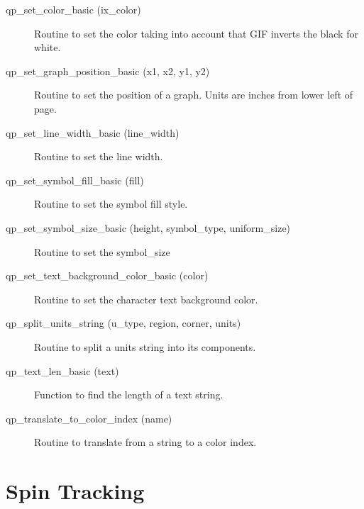 \begin{description}
\label{r:qp.set.color.basic}
\item[qp_set_color_basic (ix_color)  ] \Newline 
Routine to set the color taking into account that GIF
inverts the black for white.

\label{r:qp.set.graph.position.basic}
\item[qp_set_graph_position_basic (x1, x2, y1, y2)] \Newline 
Routine to set the position of a graph.
Units are inches from lower left of page.

\label{r:qp.set.line.width.basic}
\item[qp_set_line_width_basic (line_width)] \Newline 
Routine to set the line width.

\label{r:qp.set.symbol.fill.basic}
\item[qp_set_symbol_fill_basic (fill)] \Newline 
Routine to set the symbol fill style.

\label{r:qp.set.symbol.size.basic}
\item[qp_set_symbol_size_basic (height, symbol_type, uniform_size)] \Newline 
Routine to set the symbol_size

\label{r:qp.set.text.background.color.basic}
\item[qp_set_text_background_color_basic (color)] \Newline 
Routine to set the character text background color.

\label{r:qp.split.units.string}
\item[qp_split_units_string (u_type, region, corner, units)] \Newline 
     Routine to split a units string into its components.

\label{r:qp.text.len.basic}
\item[qp_text_len_basic (text)] \Newline 
Function to find the length of a text string.

\label{r:qp.translate.to.color.index}
\item[qp_translate_to_color_index (name)] \Newline 
     Routine to translate from a string to a color index.

\end{description}

\section{Spin Tracking}
\label{r:spin}    

